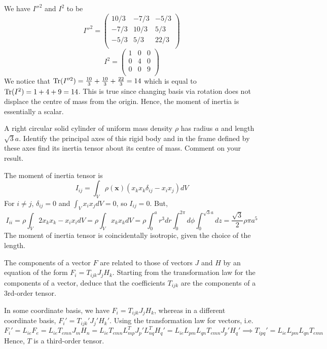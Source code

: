 \documentclass[a4paper]{article}
\begin{document}
\begin{ans}
We have $I''^2$ and $I^2$ to be
$$I''^2=\begin{pmatrix}10/3&-7/3&-5/3\\-7/3&10/3&5/3\\-5/3&5/3&22/3\\\end{pmatrix}$$
$$I^2=\begin{pmatrix}1&0&0\\0&4&0\\0&0&9\\\end{pmatrix}$$
We notice that $\operatorname{Tr}(I''^2)=\frac{10}{3}+\frac{10}{3}+\frac{22}{3}=14$ which is equal to $\operatorname{Tr}(I^2)=1+4+9=14$. This is true since changing basis via rotation does not displace the centre of mass from the origin. Hence, the moment of inertia is essentially a scalar.
\end{ans}
\newpage
\begin{qns}
A right circular solid cylinder of uniform mass density $\rho$ has radius $a$ and length $\sqrt{3}a$. Identify the principal axes of this rigid body and in the frame defined by these axes find its inertia tensor about its centre of mass. Comment on your result.
\end{qns}
\begin{ans}
The moment of inertia tensor is
$$I_{ij}=\int_V\rho(\mathbf{x})(x_kx_k\delta_{ij}-x_ix_j)dV$$
For $i\neq j$, $\delta_{ij}=0$ and $\int_Vx_ix_jdV=0$, so $I_{ij}=0$. But,
$$I_{ii}=\rho\int_V2x_kx_k-x_ix_idV=\rho\int_Vx_kx_kdV=\rho\int_0^a r^3dr\int_0^{2\pi}d\phi\int_0^{\sqrt{3}a}dz=\frac{\sqrt{3}}{2}\rho\pi a^5$$
The moment of inertia tensor is coincidentally isotropic, given the choice of the length.
\end{ans}
\begin{qns}
The components of a vector $F$ are related to those of vectors $J$ and $H$ by an equation of the form $F_i=T_{ijk}J_jH_k$. Starting from the transformation law for the components of a vector, deduce that the coefficients $T_{ijk}$ are the components of a 3rd-order tensor.
\end{qns}
\begin{ans}
In some coordinate basis, we have $F_i=T_{ijk}J_jH_k$, whereas in a different coordinate basis, $F_i'=T_{ijk}'J_j'H_k'$. Using the transformation law for vectors, i.e. 
$$F_i'=L_{ie}F_e=L_{ie}T_{emn}J_mH_n=L_{ie}T_{emn}L_{mp}^TJ_p'L^T_{nq}H_q'=L_{ie}L_{pm}L_{qn}T_{emn}J_p'H_q'\implies T_{ipq}'=L_{ie}L_{pm}L_{qn}T_{emn}$$
Hence, $T$ is a third-order tensor.
\end{ans}
\end{document}
